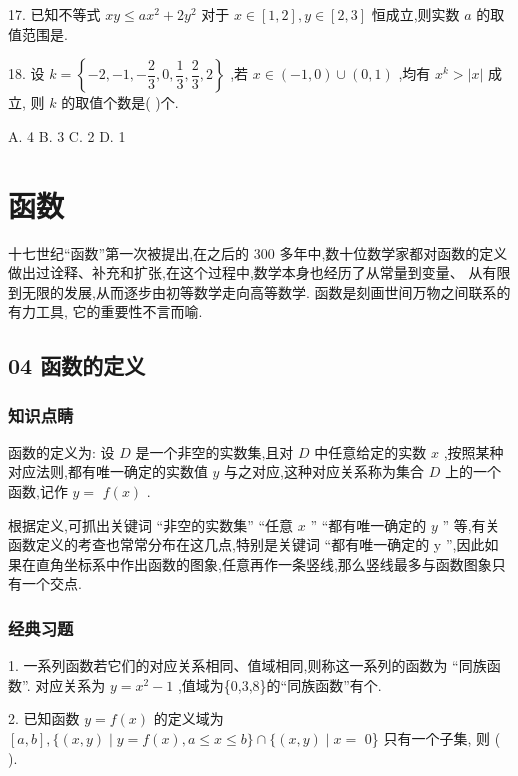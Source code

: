 17. 已知不等式 ${xy} \leq  a{x}^{2} + 2{y}^{2}$ 对于 $x \in  \left\lbrack  {1,2}\right\rbrack  ,y \in  \left\lbrack  {2,3}\right\rbrack$ 恒成立,则实数 $a$ 的取值范围是\blkda{}.

18. 设 $k = \left\{  {-2, - 1, - \dfrac{2}{3},0,\dfrac{1}{3},\dfrac{2}{3},2}\right\}$ ,若 $x \in  \left( {-1,0}\right)  \cup  \left( {0,1}\right)$ ,均有 ${x}^{k} > \left| x\right|$ 成立, 则 $k$ 的取值个数是(   )个.

A. 4 B. 3 C. 2 D. 1

\section*{函数}

十七世纪“函数”第一次被提出,在之后的 300 多年中,数十位数学家都对函数的定义做出过诠释、补充和扩张,在这个过程中,数学本身也经历了从常量到变量、 从有限到无限的发展,从而逐步由初等数学走向高等数学. 函数是刻画世间万物之间联系的有力工具, 它的重要性不言而喻.

\subsection*{04 函数的定义}

\subsubsection*{知识点睛}

函数的定义为: 设 $D$ 是一个非空的实数集,且对 $D$ 中任意给定的实数 $x$ ,按照某种对应法则,都有唯一确定的实数值 $y$ 与之对应,这种对应关系称为集合 $D$ 上的一个函数,记作 $y =$  $f\left( x\right)$ .

根据定义,可抓出关键词 “非空的实数集” “任意 $x$ ” “都有唯一确定的 $y$ ” 等,有关函数定义的考查也常常分布在这几点,特别是关键词 “都有唯一确定的 y ”,因此如果在直角坐标系中作出函数的图象,任意再作一条竖线,那么竖线最多与函数图象只有一个交点.

\subsubsection*{经典习题}

1. 一系列函数若它们的对应关系相同、值域相同,则称这一系列的函数为 “同族函数”. 对应关系为 $y = {x}^{2} - 1$ ,值域为\{0,3,8\}的“同族函数”有\blkda{}个.

2. 已知函数 $y = f\left( x\right)$ 的定义域为 $\left\lbrack  {a,b}\right\rbrack  ,\{ \left( {x,y}\right)  \mid  y = f\left( x\right) ,a \leq  x \leq  b\}  \cap  \{ \left( {x,y}\right)  \mid  x =$ 0\} 只有一个子集, 则 (   ).


